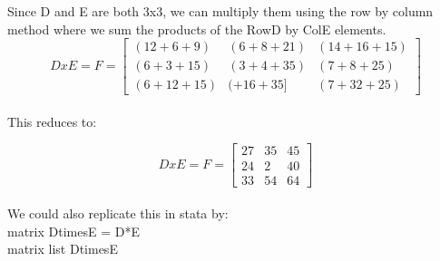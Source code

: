 \documentclass[11pt]{article}
\begin{document}
Since D and E are both 3x3, we can multiply them using the row by column method where we sum the products of the RowD by ColE elements. \\

\[DxE=F=
\left[
\begin{array}{ccc}
(12+6+9)&(6+8+21)&(14+16+15)\\
(6+3+15)&(3+4+35)&(7+8+25)\\
(6+12+15)&(+16+35]&(7+32+25)
\end{array} 
\right]
 \]\\

This reduces to:

\[DxE=F=
\left[
\begin{array}{ccc}
27&35&45\\
24&2&40\\
33&54&64
\end{array} 
\right]
 \]\\

We could also replicate this in stata by:\\
matrix DtimesE = D*E\\
matrix list DtimesE\\
\end{document}
